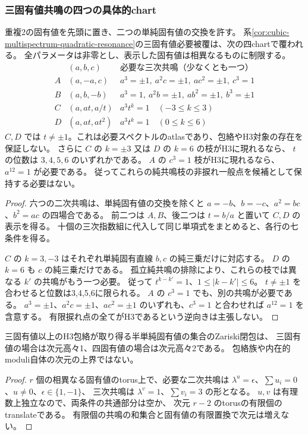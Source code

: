 \subsubsection{三固有値共鳴の四つの具体的chart}
\begin{proposition}[二次・三次共鳴の有限スペクトルatlas]
\label{prop:cubic-three-spectrum-atlas}
重複2の固有値を先頭に置き、二つの単純固有値の交換を許す。
系\ref{cor:cubic-multispectrum-quadratic-resonance}の三固有値必要被覆は、次の四chartで覆われる。
全パラメータは非零とし、表示した固有値は相異なるものに制限する。
\[
\begin{array}{c|c|l}
 & (a,b,c)&\text{必要な三次共鳴（少なくとも一つ）}\\\hline
 A&(a,-a,c)&a^3=\pm1,\ a^2c=\pm1,\ ac^2=\pm1,\ c^3=1\\
 B&(a,b,-b)&a^3=1,\ a^2b=\pm1,\ ab^2=\pm1,\ b^3=\pm1\\
 C&(a,at,a/t)&a^3t^k=1\quad(-3\le k\le3)\\
 D&(a,at,at^2)&a^3t^k=1\quad(0\le k\le6)
\end{array}
\]
$C,D$ では $t\ne\pm1$。これは必要スペクトルのatlasであり、包絡やH3対象の存在を保証しない。
さらに $C$ の $k=\pm3$ 又は $D$ の $k=6$ の枝がH3に現れるなら、
$t$ の位数は $3,4,5,6$ のいずれかである。
$A$ の $c^3=1$ 枝がH3に現れるなら、$a^{12}=1$ が必要である。
従ってこれらの純共鳴枝の非捩れ一般点を候補として保持する必要はない。
\end{proposition}
\begin{proof}
六つの二次共鳴は、単純固有値の交換を除くと
$a=-b$、$b=-c$、$a^2=bc$、$b^2=ac$ の四場合である。
前二つは $A,B$、後二つは $t=b/a$ と置いて $C,D$ の表示を得る。
十個の三次指数組に代入して同じ単項式をまとめると、各行の七条件を得る。

$C$ の $k=3,-3$ はそれぞれ単純固有直線 $b,c$ の純三乗だけに対応する。
$D$ の $k=6$ も $c$ の純三乗だけである。
孤立純共鳴の排除により、これらの枝では異なる $k'$ の共鳴がもう一つ必要。
従って $t^{k-k'}=1$、$1\le|k-k'|\le6$。
$t\ne\pm1$ を合わせると位数は3,4,5,6に限られる。
$A$ の $c^3=1$ でも、別の共鳴が必要である。
$a^3=\pm1$、$a^2c=\pm1$、$ac^2=\pm1$ のいずれも、$c^3=1$ と合わせれば $a^{12}=1$ を含意する。
有限捩れ点の全てがH3であるという逆向きは主張しない。
\end{proof}

\begin{corollary}[半単純固有値集合の次元上界]
\label{cor:cubic-spectral-dimension}
三固有値以上のH3包絡が取り得る半単純固有値の集合のZariski閉包は、
三固有値の場合は次元高々1、四固有値の場合は次元高々2である。
包絡族や内在的moduli自体の次元の上界ではない。
\end{corollary}
\begin{proof}
$r$ 個の相異なる固有値のtorus上で、必要な二次共鳴は
$\lambda^u=\epsilon$、$\sum u_i=0$、$u\ne0$、$\epsilon\in\{1,-1\}$、
三次共鳴は $\lambda^v=1$、$\sum v_i=3$ の形となる。
$u,v$ は有理数上独立なので、両条件の共通部分は空か、
次元 $r-2$ のtorusの有限個のtranslateである。
有限個の共鳴の和集合と固有値の有限置換で次元は増えない。
\end{proof}

